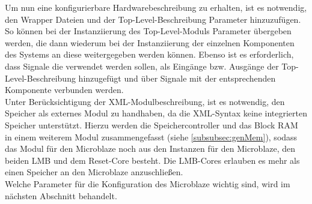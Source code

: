 Um nun eine konfigurierbare Hardwarebeschreibung zu erhalten, ist es notwendig, den Wrapper Dateien und der Top-Level-Beschreibung Parameter hinzuzufügen. So können bei der Instanziierung des Top-Level-Moduls Parameter übergeben werden, die dann wiederum bei der Instanziierung der einzelnen Komponenten des Systems an diese weitergegeben werden können. Ebenso ist es erforderlich, dass Signale die verwendet werden sollen, als Eingänge bzw. Ausgänge der Top-Level-Beschreibung hinzugefügt und über Signale mit der entsprechenden Komponente verbunden werden.\\
Unter Berücksichtigung der XML-Modulbeschreibung, ist es notwendig, den Speicher als externes Modul zu handhaben, da die XML-Syntax keine integrierten Speicher unterstützt. Hierzu werden die Speichercontroller und das Block RAM in einem weiterem Modul zusammengefasst (siehe \ref{subsubsec:genMem}), sodass das Modul für den Microblaze noch aus den Instanzen für den Microblaze, den beiden LMB und dem Reset-Core besteht. Die LMB-Cores erlauben es mehr als einen Speicher an den Microblaze anzuschließen.\\
Welche Parameter für die Konfiguration des Microblaze wichtig sind, wird im nächsten Abschnitt behandelt. 
